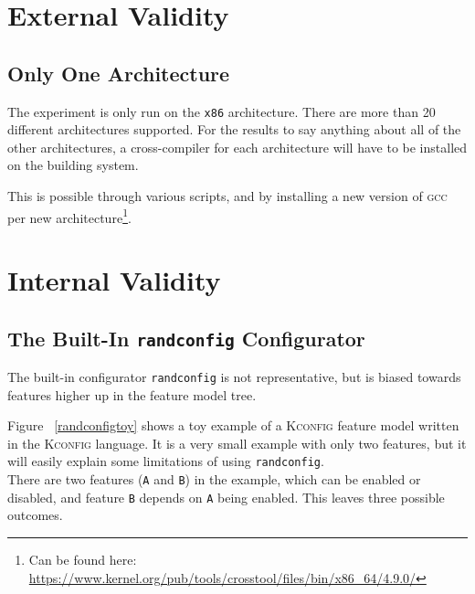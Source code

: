 \documentclass[a4paper,11pt]{report}
\newcommand{\f}{\footnote{\fn}}
\begin{document}
            \section{External Validity}
            \label{sec:extval}


            \subsection{Only One Architecture}

The experiment is only run on the \texttt{x86} architecture. There are more than
20 different architectures supported. For the results to say anything about all 
of the other architectures, a cross-compiler for each architecture will have to
be installed on the building system.

            \def \fn {Can be found here: 
            \url{https://www.kernel.org/pub/tools/crosstool/files/bin/x86_64/4.9.0/}}

This is possible through various scripts, and by installing a new version of
\textsc{gcc} per new architecture\f.



            \section{Internal Validity}
            \label{sec:intval}

            \subsection{The Built-In \texttt{randconfig} Configurator}
            \label{sec:randconfbias}

The built-in configurator \texttt{randconfig} is not representative, but is 
biased towards features higher up in the feature model tree. 

Figure ~\ref{randconfigtoy} shows a toy example of a \textsc{Kconfig} feature 
model written in the \textsc{Kconfig} language.  It is a very small example 
with only two features, but it will easily explain some limitations of using 
\texttt{randconfig}.
\\

There are two features (\texttt{A} and \texttt{B}) in the example, which can be 
enabled or disabled, and feature \texttt{B} depends on \texttt{A} being enabled.
This leaves three possible outcomes. 
\end{document}
